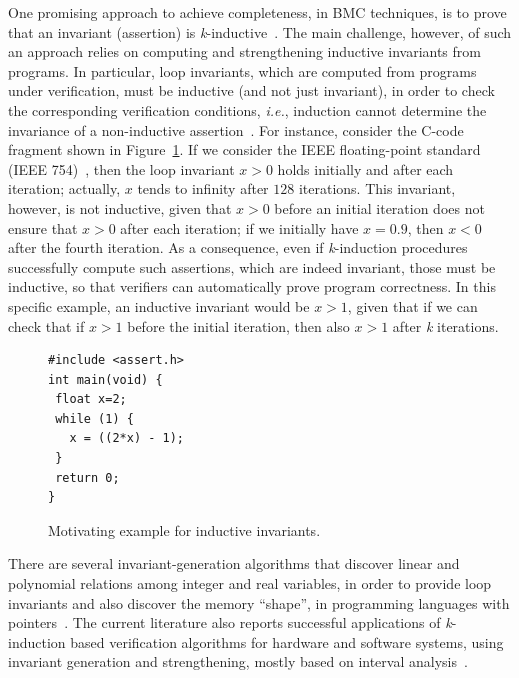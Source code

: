 \documentclass[format=acmsmall, review=false, screen=true]{acmart}
\begin{document}
One promising approach to achieve completeness, in BMC techniques, is to prove that an invariant (assertion) is \textit{k}-inductive~\cite{EenS03,Sheera00}. The main challenge, however, of such an approach relies on computing and strengthening inductive invariants from programs. In particular, loop invariants, which are computed from programs under verification, must be inductive (and not just invariant), in order to check the corresponding verification conditions, {\it i.e.}, induction cannot determine the invariance of a non-inductive assertion~\cite{Bradley07}. 
%
For instance, consider the C-code fragment shown in Figure~\ref{figure:inductive-invariant}. If we consider the IEEE floating-point standard (IEEE 754)~\cite{4610935,Goldberg91whatevery}, then  the loop invariant $x>0$ holds initially and after each iteration; actually, $x$ tends to infinity after $128$ iterations. This invariant, however, is not inductive, given that $x>0$ before an initial iteration does not ensure that $x>0$ after each iteration; if we initially have $x=0.9$, then $x<0$ after the fourth iteration. As a consequence, even if \textit{k}-induction procedures successfully compute such assertions, which are indeed invariant, those must be inductive, so that verifiers can automatically prove program correctness. In this specific example, an inductive invariant would be $x>1$, given that if we can check that if $x>1$ before the initial iteration, then also $x>1$ after \textit{k} iterations.
%
\begin{figure}[h]
\centering
\begin{minipage}{0.45\textwidth}
\begin{lstlisting}
#include <assert.h>
int main(void) {
 float x=2;
 while (1) {
   x = ((2*x) - 1);
 }
 return 0;
}
\end{lstlisting}
\end{minipage}
\caption{Motivating example for inductive invariants.}
\label{figure:inductive-invariant}
\end{figure}


There are several invariant-generation algorithms that discover linear and polynomial relations among integer and real variables, in order to provide loop invariants and also discover the memory ``shape'', in programming languages with pointers~\cite{pips:2013,Henry:2012}. The current literature also reports successful applications of \textit{k}-induction based verification algorithms for hardware and software systems, using invariant generation and strengthening, mostly based on interval analysis~\cite{Beyer15}. 
\end{document}
